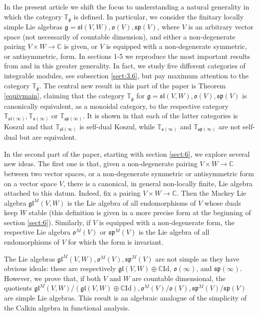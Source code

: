\documentclass{svmult}
\newcommand {\CC} {\mathbb {C}}
\newcommand{\TT}{\mathbb{T}}
\renewcommand{\sp}{\mathfrak{sp}}
\renewcommand{\sl}{\mathfrak{sl}}
\newcommand{\oo}{\mathfrak{o}}
\renewcommand{\gg}{\mathfrak{g}}
\newcommand{\gl}{\mathfrak{gl}}
\begin{document}
In the present article we shift the focus to understanding a natural
generality in which the category $\TT_\gg$ is defined. 
In particular, we consider the finitary locally simple Lie algebras
$\gg = \sl(V,W), \oo(V), \sp(V)$, 
where $V$ is an arbitrary vector space (not necessarily of countable dimension), and either a non-degenerate pairing 
$V \times W \rightarrow \CC$ is given, or $V$ is equipped with a
non-degenerate symmetric, or antisymmetric, form. In sections 1-5 we
reproduce the most important results from \cite{pstyr} and \cite{DPS}
in this greater generality. In fact, we study five different
categories of integrable modules, see subsection \ref{sect:3.6}, but
pay maximum attention to the category $\TT_\gg$. The central new
result in this part of the paper is Theorem \ref{equivmain}, claiming
that the category $\TT_\gg$ for $\gg = \sl(V,W), \oo(V), \sp(V)$ is canonically equivalent, as a
monoidal category, to the respective category 
$\TT_{\sl(\infty)}, \TT_{\oo(\infty)}$ or $\TT_{\sp(\infty)}$. It is
shown in \cite{DPS} 
that each of the latter categories is Koszul and that
$\TT_{\sl(\infty)}$ is self-dual Koszul, while 
$\TT_{\oo(\infty)}$ and $\TT_{\sp(\infty)}$ are not self-dual but are equivalent.

In the second part of the paper, starting with section \ref{sect:6},
we explore several new ideas. The first one is that, 
given a non-degenerate pairing $V \times W \rightarrow \CC$ between
two vector spaces, or a non-degenerate symmetric or antisymmetric form
on a vector space $V$, there is a canonical, in general non-locally
finite, Lie algebra attached to this datum. 
Indeed, fix a pairing $V \times W \rightarrow \CC$. Then the Mackey
Lie algebra $\gl^M(V,W)$ is the Lie algebra of all endomorphisms of
$V$ whose duals keep $W$ stable (this definition is given in a more
precise form at the beginning of section 
\ref{sect:6}). Similarly, if $V$ is equipped with a non-degenerate
form, the respective Lie algebra 
$\oo^M(V)$ or $\sp^M(V)$ is the Lie algebra of all endomorphisms of $V$ for which the form is invariant. 

The Lie algebras $\gl^M(V,W),\oo^M(V),\sp^M(V)$ are not simple as they
have obvious ideals: these are respectively 
$\gl(V,W) \oplus \CC\mathrm{Id}$, $\oo(\infty)$, and $\sp(\infty)$. However, we
prove that, if both $V$ and $W$ are countable dimensional, the
quotients $\gl^M(V,W)/(\gl(V,W)\oplus\CC\mathrm{Id}), \oo^M(V)/\oo(V),
\sp^M(V)/\sp(V)$ are simple Lie algebras. 
This result is an algebraic analogue of the simplicity of the Calkin algebra in functional analysis.
\end{document}
